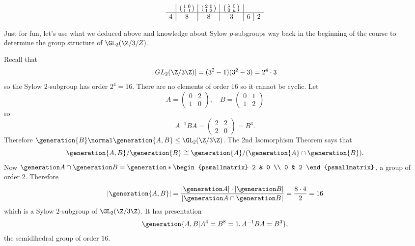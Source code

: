 \documentclass[a4paper]{article}
\begin{document}
\begin{eg}
\[\begin{array}[h]{c|c|c|c|c|c}
          &
            \begin{psmallmatrix}
              1 & 0 \\
              1 & 1
            \end{psmallmatrix}
          &
            \begin{psmallmatrix}
              2 & 0 \\
              1 & 2
            \end{psmallmatrix}
          &
            \begin{psmallmatrix}
              \lambda & 0 \\
              0 & \mu
            \end{psmallmatrix}
      \\ \hline
      4 & 8 & 8 & 3 & 6 & 2
    \end{array}
  \]
\end{eg}

Just for fun, let's use what we deduced above and knowledge about Sylow \(p\)-subgroups way back in the beginning of the course to determine the group structure of \(\GL_2(\Z/3/Z)\).

Recall that
\[
  |GL_2(\Z/3\Z)| = (3^2 - 1)(3^2 - 3) = 2^4 \cdot 3
\]
so the Sylow \(2\)-subgroup has order \(2^4 = 16\). There are no elements of order \(16\) so it cannot be cyclic. Let
\[
  A =
  \begin{pmatrix}
    0 & 2 \\
    1 & 0
  \end{pmatrix}
  ,\quad
  B =
  \begin{pmatrix}
    0 & 1 \\
    1 & 2
  \end{pmatrix}
\]
so
\[
  A^{-1}BA =
  \begin{pmatrix}
    2 & 2 \\
    2 & 0
  \end{pmatrix}
  = B^3.
\]
Therefore \(\generation{B} \normal \generation{A, B} \leq \GL_2(\Z/3\Z)\). The 2nd Isomorphism Theorem says that
\[
  \generation{A, B}/\generation{B} \cong \generation{A}/(\generation{A} \cap \generation{B}).
\]
Now \(\generation A \cap \generation B = \generation*{\begin{psmallmatrix} 2 & 0 \\ 0 & 2 \end{psmallmatrix}}\), a group of order \(2\). Therefore
\[
  |\generation{A, B}| = \frac{|\generation A| \cdot |\generation B|}{|\generation A \cap \generation B|} = \frac{8 \cdot 4}{2} = 16
\]
which is a Sylow \(2\)-subgroup of \(\GL_2(\Z/3\Z)\). It has presentation
\[
  \generation{A, B| A^4 = B^8 = 1, A^{-1}BA = B^3},
\]
the semidihedral group of order \(16\).
\end{document}
